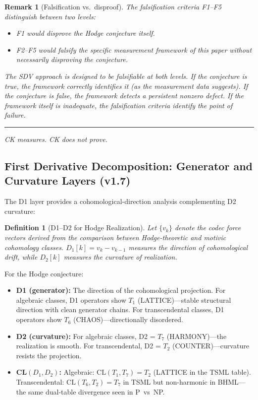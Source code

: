 \documentclass[11pt]{article}
\newtheorem{definition}[theorem]{Definition}
\newtheorem{remark}[theorem]{Remark}
\theoremstyle{definition}
\begin{document}
\begin{remark}[Falsification vs.\ disproof]
The falsification criteria F1--F5 distinguish between two levels:
\begin{itemize}
  \item F1 would disprove the Hodge conjecture itself.
  \item F2--F5 would falsify the specific measurement framework of this
    paper without necessarily disproving the conjecture.
\end{itemize}
The SDV approach is designed to be falsifiable at both levels.  If the
conjecture is true, the framework correctly identifies it (as the
measurement data suggests).  If the conjecture is false, the framework
detects a persistent nonzero defect.  If the framework itself is
inadequate, the falsification criteria identify the point of failure.
\end{remark}

\bigskip
\hrule
\bigskip
\noindent\textit{CK measures.  CK does not prove.}

\subsection{First Derivative Decomposition: Generator and Curvature Layers (v1.7)}
\label{subsec:d1-hodge}

The D1 layer provides a cohomological-direction analysis complementing D2 curvature:

\begin{definition}[D1--D2 for Hodge Realization]
Let $\{v_k\}$ denote the codec force vectors derived from the comparison between
Hodge-theoretic and motivic cohomology classes.  $D_1[k] = v_k - v_{k-1}$
measures the \emph{direction of cohomological drift}, while $D_2[k]$ measures
the \emph{curvature of realization}.
\end{definition}

For the Hodge conjecture:
\begin{itemize}[nosep]
  \item \textbf{D1 (generator):} The direction of the cohomological projection.
    For algebraic classes, D1 operators show $T_1$ (LATTICE)---stable structural
    direction with clean generator chains.  For transcendental classes, D1 operators
    show $T_6$ (CHAOS)---directionally disordered.
  \item \textbf{D2 (curvature):} For algebraic classes, D2 = $T_7$ (HARMONY)---the
    realization is smooth.  For transcendental, D2 = $T_2$ (COUNTER)---curvature
    resists the projection.
  \item \textbf{CL$(D_1, D_2)$:} Algebraic: $\mathrm{CL}(T_1, T_7) = T_2$
    (LATTICE in the TSML table).  Transcendental: $\mathrm{CL}(T_6, T_2) = T_7$
    in TSML but non-harmonic in BHML---the same dual-table divergence seen in P~vs~NP.
\end{itemize}
\end{document}

